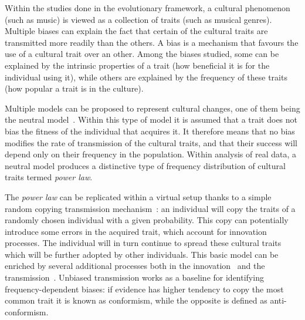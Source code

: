 \documentclass{wscpaperproc}
\begin{document}
Within the studies done in the evolutionary framework, a cultural phenomenon (such as music) is viewed as a collection of traits (such as musical genres). Multiple biases can explain the fact that certain of the cultural traits are transmitted more readily than the others. A bias is a mechanism that favours the use of a cultural trait over an other. Among the biases studied, some can be explained by the intrinsic properties of a trait (how beneficial it is for the individual using it), while others are explained by the frequency of these traits (how popular a trait is in the culture). 

Multiple models can be proposed to represent cultural changes, one of them being the neutral model~\cite{neiman_stylistic_1995}. Within this type of model it is assumed that a trait does not bias the fitness of the individual that acquires it. It therefore means that no bias modifies the rate of transmission of the cultural traits, and that their success will depend only on their frequency in the population. Within analysis of real data, a neutral model produces a distinctive type of frequency distribution of cultural traits termed \emph{power law}.
 
The \emph{power law} can be replicated within a virtual setup thanks to a simple random copying transmission mechanism~\cite{bentley_random_2004}: an individual will copy the traits of a randomly chosen individual with a given probability. This copy can potentially introduce some errors in the acquired trait, which account for innovation processes. The individual will in turn continue to spread these cultural traits which will be further adopted by other individuals. This basic model can be enriched by several additional processes both in the innovation~ and the transmission~\cite{heyes_social_1994,henrich_evolution_2003}. Unbiased transmission works as a baseline for identifying frequency-dependent biases: if evidence has higher tendency to copy the most common trait it is known as conformism, while the opposite is defined as anti-conformism.
\end{document}
